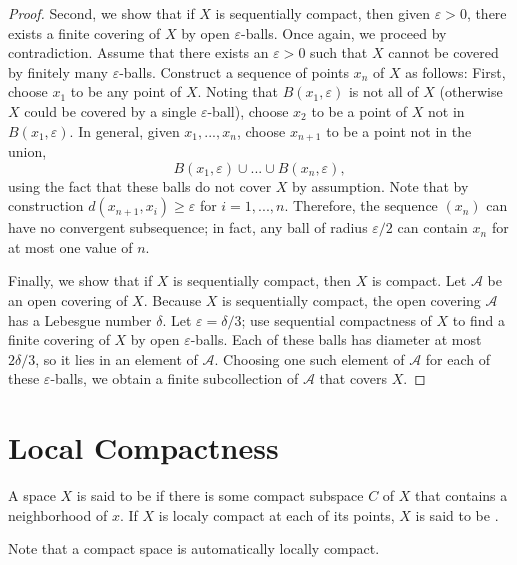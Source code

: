 \documentclass[12pt, a4paper, oneside, openright, titlepage]{book}
\begin{document}
\begin{proof}
    Second, we show that if $X$ is sequentially compact, then given $\varepsilon > 0$, there exists a finite covering of $X$ by open $\varepsilon$-balls. Once again, we proceed by contradiction. Assume that there exists an $\varepsilon > 0$ such that $X$ cannot be covered by finitely many $\varepsilon$-balls. Construct a sequence of points $x_n$ of $X$ as follows: First, choose $x_1$ to be any point of $X$. Noting that $B(x_1,\varepsilon)$ is not all of $X$ (otherwise $X$ could be covered by a single $\varepsilon$-ball), choose $x_2$ to be a point of $X$ not in $B(x_1,\varepsilon)$. In general, given $x_1,...,x_n$, choose $x_{n+1}$ to be a point not in the union, \begin{equation*}
        B(x_1,\varepsilon)\cup...\cup B(x_n,\varepsilon),
    \end{equation*}
    using the fact that these balls do not cover $X$ by assumption. Note that by construction $d(x_{n+1},x_i) \geq \varepsilon$ for $i = 1,...,n$. Therefore, the sequence $(x_n)$ can have no convergent subsequence; in fact, any ball of radius $\varepsilon/2$ can contain $x_n$ for at most one value of $n$.

    Finally, we show that if $X$ is sequentially compact, then $X$ is compact. Let $\mathcal{A}$ be an open covering of $X$. Because $X$ is sequentially compact, the open covering $\mathcal{A}$ has a Lebesgue number $\delta$. Let $\varepsilon = \delta/3$; use sequential compactness of $X$ to find a finite covering of $X$ by open $\varepsilon$-balls. Each of these balls has diameter at most $2\delta/3$, so it lies in an element of $\mathcal{A}$. Choosing one such element of $\mathcal{A}$ for each of these $\varepsilon$-balls, we obtain a finite subcollection of $\mathcal{A}$ that covers $X$.
\end{proof}


\section{Local Compactness}

\begin{definition}
    A space $X$ is said to be  if there is some compact subspace $C$ of $X$ that contains a neighborhood of $x$. If $X$ is localy compact at each of its points, $X$ is said to be .
\end{definition}

Note that a compact space is automatically locally compact.
\end{document}
